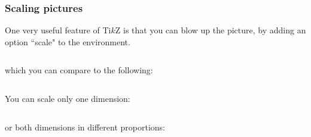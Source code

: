 %
%
\begin{frame}[fragile]
  \frametitle{
    Scaling pictures
  }

  One very useful feature of Ti$k$Z is that you can blow up the picture, by adding an option ``scale" to the environment.

  \begin{columns}
    \begin{column}{0.6\textwidth}
      
    \end{column}
    \begin{column}{0.4\textwidth}
      
    \end{column}
  \end{columns}

  which you can compare to the following: 

  
  \begin{columns}
    \begin{column}{0.6\textwidth}
      
    \end{column}
    \begin{column}{0.4\textwidth}
      
    \end{column}
  \end{columns}
  
\end{frame}
\begin{frame}[containsverbatim]
You can scale only one dimension:

  \begin{columns}
    \begin{column}{0.6\textwidth}
      
    \end{column}
    \begin{column}{0.4\textwidth}
      
    \end{column}
  \end{columns}


or both dimensions in different proportions:

  \begin{columns}
    \begin{column}{0.6\textwidth}
      
    \end{column}
    \begin{column}{0.4\textwidth}
      
    \end{column}
  \end{columns}

\end{frame}

